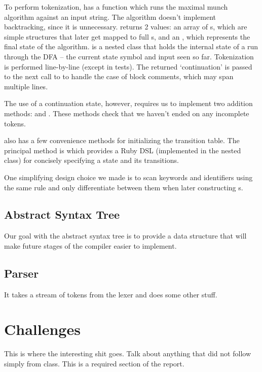 \documentclass[pdftex,11pt,a4paper]{article}
\begin{document}
To perform tokenization,  has a function 
which runs the maximal munch algorithm against an input string. The
algorithm doesn't implement backtracking, since it is unnecessary.
 returns 2 values: an array of s, which
are simple structures that later get mapped to full s,
and an , which represents the final state of the
algorithm.  is a nested class that holds the internal
state of a run through the DFA -- the current state symbol and input seen so
far. Tokenization is performed line-by-line (except in tests). The
returned  `continuation' is passed to the next
call to  to handle the case of block comments, which may
span multiple lines.

The use of a continuation state, however, requires us to implement two
addition  methods:  and 
. These methods check that we haven't
ended on any incomplete tokens.

 also has a few convenience methods for initializing the
transition table. The principal method is  which provides a
Ruby DSL (implemented in the  nested class) for
concisely specifying a state and its transitions.

One simplifying design choice we made is to scan keywords and identifiers
using the same rule and only differentiate between them when later
constructing s.

\subsection{Abstract Syntax Tree}

Our goal with the abstract syntax tree is to provide a data structure
that will make future stages of the compiler easier to implement.


\subsection{Parser}

It takes a stream of tokens from the lexer and does some other stuff.


\section{Challenges}


This is where the interesting shit goes. Talk about anything that did
not follow simply from class. This is a required section of the report.
\end{document}
